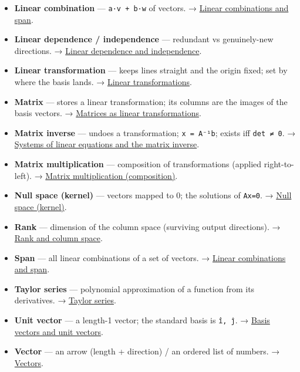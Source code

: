 \documentclass[
  10pt,
  letterpaper,
  onecolumn]{article}
\begin{document}
\begin{itemize}
\item
  \textbf{Linear combination} --- \texttt{a·v\ +\ b·w} of vectors. →
  \protect\hyperlink{linear-combinations-and-span}{Linear combinations
  and span}.
\item
  \textbf{Linear dependence / independence} --- redundant vs
  genuinely-new directions. →
  \protect\hyperlink{linear-dependence-and-independence}{Linear
  dependence and independence}.
\item
  \textbf{Linear transformation} --- keeps lines straight and the origin
  fixed; set by where the basis lands. →
  \protect\hyperlink{linear-transformations}{Linear transformations}.
\item
  \textbf{Matrix} --- stores a linear transformation; its columns are
  the images of the basis vectors. →
  \protect\hyperlink{matrices-as-linear-transformations}{Matrices as
  linear transformations}.
\item
  \textbf{Matrix inverse} --- undoes a transformation;
  \texttt{x\ =\ A⁻¹b}; exists iff \texttt{det\ ≠\ 0}. →
  \protect\hyperlink{systems-of-linear-equations-and-the-matrix-inverse}{Systems
  of linear equations and the matrix inverse}.
\item
  \textbf{Matrix multiplication} --- composition of transformations
  (applied right-to-left). →
  \protect\hyperlink{matrix-multiplication-composition}{Matrix
  multiplication (composition)}.
\item
  \textbf{Null space (kernel)} --- vectors mapped to 0; the solutions of
  \texttt{Ax=0}. → \protect\hyperlink{null-space-kernel}{Null space
  (kernel)}.
\item
  \textbf{Rank} --- dimension of the column space (surviving output
  directions). → \protect\hyperlink{rank-and-column-space}{Rank and
  column space}.
\item
  \textbf{Span} --- all linear combinations of a set of vectors. →
  \protect\hyperlink{linear-combinations-and-span}{Linear combinations
  and span}.
\item
  \textbf{Taylor series} --- polynomial approximation of a function from
  its derivatives. → \protect\hyperlink{taylor-series}{Taylor series}.
\item
  \textbf{Unit vector} --- a length-1 vector; the standard basis is
  \texttt{î,\ ĵ}. →
  \protect\hyperlink{basis-vectors-and-unit-vectors}{Basis vectors and
  unit vectors}.
\item
  \textbf{Vector} --- an arrow (length + direction) / an ordered list of
  numbers. → \protect\hyperlink{vectors}{Vectors}.
\end{itemize}
\end{document}
